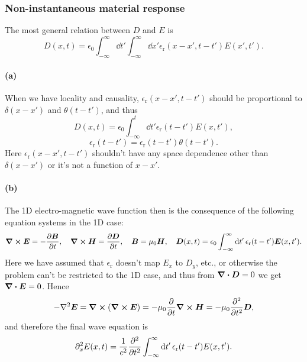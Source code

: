 \documentclass[hyperref, a4paper]{article}
\newcommand{\epsr}{\epsilon_{\text{r}}}
\begin{document}
\subsubsection{Non-instantaneous material response}

The most general relation between $D$ and $E$ is 
\begin{equation}
    D(x, t) = \epsilon_0 \int_{-\infty}^{\infty} \dd{t'} 
    \int_{-\infty}^{\infty} \dd{x'} 
    \epsr(x - x', t - t') E(x', t').
\end{equation}

\paragraph{(a)} When we have locality and causality, 
$\epsr(x - x', t - t')$ should be proportional to 
$\delta(x - x')$ and $\theta(t - t')$,
and thus 
\begin{equation}
    D(x, t) = \epsilon_0 \int_{-\infty}^{t} \dd{t'} 
    \epsr(t - t') E(x, t'), 
\end{equation}
\begin{equation}
    \epsr(t - t') = \epsr(t - t') \theta(t - t').
\end{equation}
Here $\epsr(x - x', t - t')$ shouldn't have any space dependence 
other than $\delta(x - x')$ or it's not a function of $x - x'$.

\paragraph{(b)} The 1D electro-magnetic wave function then
is the consequence of the following equation systems
in the 1D case:
\begin{equation}
    \curl{\vb*{E}} = - \pdv{\vb*{B}}{t} , \quad 
    \curl{\vb*{H}} = \pdv{\vb*{D}}{t}, \quad 
    \vb*{B} = \mu_0 \vb*{H}, \quad 
    \vb*{D}(x, t) = \epsilon_0 \int_{-\infty}^{\infty} \dd{t'} 
    \epsr(t - t') \vb*{E}(x, t').
\end{equation}
Here we have assumed that $\epsr$ doesn't map $E_x$ to $D_y$, etc.,
or otherwise the problem can't be restricted to the 1D case,
and thus from $\div{\vb*{D}} = 0$ we get $\div{\vb*{E}} = 0$.
Hence 
\begin{equation}
    \begin{aligned}
        - \laplacian \vb*{E} = \curl{(\curl{\vb*{E}})} = 
        - \mu_0 \pdv{t} \curl{\vb*{H}}
        = - \mu_0 \pdv[2]{t} \vb*{D},
    \end{aligned}
\end{equation}
and therefore the final wave equation is 
\begin{equation}
    \partial_x^2 E(x, t) = \frac{1}{c^2} \pdv[2]{t} 
    \int_{-\infty}^{\infty} \dd{t'} \epsr(t - t') E(x, t').
    \label{eq:wave-eq-retarded}
\end{equation}
\end{document}
